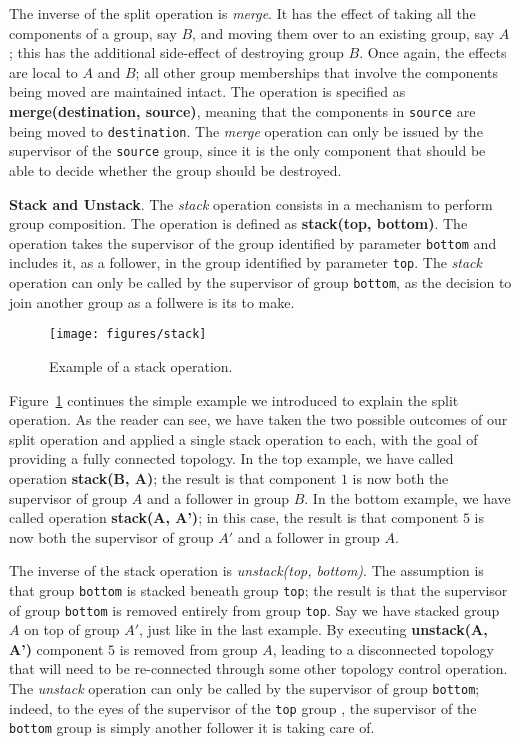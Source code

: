 The inverse of the split operation is \emph{merge}. It has the effect of taking all the components of a group, say $B$, and moving them over to an existing group, say $A$; this has the additional side-effect of destroying group $B$. Once again, the effects are local to $A$ and $B$; all other group memberships that involve the components being moved are maintained intact. The operation is specified as \textbf{merge(destination, source)}, meaning that the components in \texttt{source} are being moved to \texttt{destination}. The \emph{merge} operation can only be issued by the supervisor of the \texttt{source} group, since it is the only component that should be able to decide whether the group should be destroyed.


\textbf{Stack and Unstack}. The \emph{stack} operation consists in a mechanism to perform group composition. The operation is defined as \textbf{stack(top, bottom)}. The operation takes the supervisor of the group identified by parameter \texttt{bottom} and includes it, as a follower, in the group identified by parameter \texttt{top}. The \emph{stack} operation can only be called by the supervisor of group \texttt{bottom}, as the decision to join another group as a follwere is its to make.

\begin{figure}[htb]
	\begin{center}
		\texttt{[image: figures/stack]}
	\end{center}
	\caption{Example of a stack operation.}
	\label{fig:stack}
\end{figure}

Figure~\ref{fig:stack} continues the simple example we introduced to explain the split operation. As the reader can see, we have taken the two possible outcomes of our split operation and applied a single stack operation to each, with the goal of providing a fully connected topology. In the top example, we have called operation \textbf{stack(B, A)}; the result is that component $1$ is now both the supervisor of group $A$ and a follower in group $B$. In the bottom example, we have called operation \textbf{stack(A, A')}; in this case, the result is that component $5$ is now both the supervisor of group $A'$ and a follower in group $A$. 

The inverse of the stack operation is \emph{unstack(top, bottom)}. The assumption is that group \texttt{bottom} is stacked beneath group \texttt{top}; the result is that the supervisor of group \texttt{bottom} is removed entirely from group \texttt{top}. Say we have stacked group $A$ on top of group $A'$, just like in the last example. By executing \textbf{unstack(A, A')} component $5$ is removed from group $A$, leading to a disconnected topology that will need to be re-connected through some other topology control operation. The \emph{unstack} operation can only be called by the supervisor of group \texttt{bottom}; indeed, to the eyes of the supervisor of the \texttt{top} group , the supervisor of the \texttt{bottom} group is simply another follower it is taking care of. 




